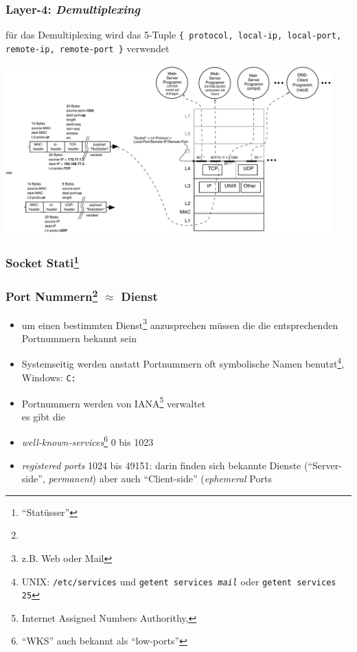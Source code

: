 \documentclass[ignorenonframetext]{beamer}
\begin{document}
\begin{frame}
\frametitle{Layer-4: {\em Demultiplexing}}
\begin{tiny}
f\"ur das Demultiplexing wird
das 5-Tuple
\texttt{\{ protocol, local-ip, local-port, remote-ip, remote-port \}}
verwendet
\end{tiny}
\includegraphics[height=6.5cm]{demultiplexing}
\end{frame}


\begin{frame}
\frametitle{Socket Stati\footnote{``Stat\"usser''}}
\end{frame}



\begin{frame}
\frametitle{Port Nummern\footnote{} $\approx$ Dienst}
\begin{itemize}
	\item{um einen bestimmten Dienst\footnote{z.B. Web oder Mail} anzusprechen m\"ussen die die entsprechenden Portnummern bekannt sein}
	\item{Systemseitig werden anstatt Portnummern oft symbolische Namen benutzt\footnote{UNIX: \texttt{/etc/services} und \texttt{getent services {\em mail}} oder \texttt{getent services 25}}, Windows: \texttt{C:\\}}
	\item{Portnummern werden von IANA\footnote{Internet Assigned Numbers Authorithy,  } verwaltet}\\es gibt die
	\item[1]{{\em well-known-services}{}\footnote{``WKS'' auch bekannt als ``low-ports''} 0 bis 1023}
	\item[2]{{\em registered ports} 1024 bis 49151: darin finden sich bekannte Dienste (``Server-side'', {\em permanent}) aber auch ``Client-side'' ({\em ephemeral} Ports}
\end{itemize}
\end{frame}
\end{document}
